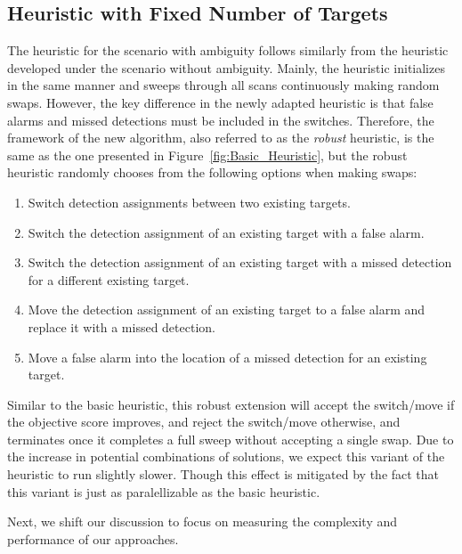 \subsection{Heuristic with Fixed Number of Targets}
The heuristic for the scenario with ambiguity follows similarly from the heuristic developed under the scenario without ambiguity. Mainly, the heuristic initializes in the same manner and sweeps through all scans continuously making random swaps. However, the key difference in the newly adapted heuristic is that false alarms and missed detections must be included in the switches. Therefore, the framework of the new algorithm, also referred to as the \textit{robust} heuristic, is the same as the one presented in Figure~\ref{fig:Basic_Heuristic}, but the robust heuristic randomly chooses from the following options when making swaps: 
\begin{enumerate}
  \item Switch detection assignments between two existing targets.
  \item Switch the detection assignment of an existing target with a false alarm.
  \item Switch the detection assignment of an existing target with a missed detection for a different existing target.
  \item Move the detection assignment of an existing target to a false alarm and replace it with a missed detection.
  \item Move a false alarm into the location of a missed detection for an existing target.
\end{enumerate}

Similar to the basic heuristic, this robust extension will accept the switch/move if the objective score improves, and reject the switch/move otherwise, and terminates once it completes a full sweep without accepting a single swap. Due to the increase in potential combinations of solutions, we expect this variant of the heuristic to run slightly slower. Though this effect is mitigated by the fact that this variant is just as paralellizable as the basic heuristic. 

Next, we shift our discussion to focus on measuring the complexity and performance of our approaches. 